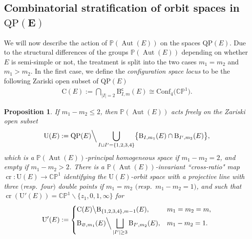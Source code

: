 \documentclass[10pt,a4paper]{amsart}
\newcommand{\field}[1]{\ensuremath{\mathbb{#1}}}
\newcommand{\CC}{\field{C}}
\newcommand{\PP}{\field{P}}
\DeclareMathOperator{\Aut}{Aut}
\numberwithin{equation}{section}
\newtheorem{Proposition}[Theorem]{Proposition}
 { \theoremstyle{definition}
\newtheorem{Definition}[Theorem]{Definition}
\newtheorem{Note}[Theorem]{Note}
\newtheorem{Example}[Theorem]{Example}
\newtheorem{Remark}[Theorem]{Remark} }
\begin{document}
\subsection[Combinatorial stratification of orbit spaces in QP(E)]
{Combinatorial stratification of orbit spaces in $\boldsymbol{\mathrm{QP}(E)}$}%
We will now describe the action of $\PP(\Aut(E))$ on the spaces $\mathrm{QP}(E)$. Due to the structural differences of the groups $\PP(\Aut(E))$ depending on whether $E$ is semi-simple or not, the treatment is split into the two cases $m_{1} = m_{2}$ and $m_{1} > m_{2}$. In the first case, we define the \emph{configuration space locus} to be the following Zariski open subset of $\mathrm{QP}(E)$
\begin{gather*}%
\mathrm{C}(E):=\bigcap_{\vert I\vert =2} \mathrm{B}^{\mathsf{c}}_{I,m}(E)\cong \mathrm{Conf}_{4}\big(\CC\PP^{1}\big).
\end{gather*}


\begin{Proposition}\label{prop:U}
If $m_{1}-m_{2} \leq 2$, then $\PP(\Aut(E))$ acts freely on the Zariski open subset
\[
\mathrm{U}(E) :=
\displaystyle\mathrm{QP}(E)\Big\backslash \bigcup_{I\sqcup I' = \{1,2,3,4\}} \bigl\{\mathrm{B}_{I,m_{1}}(E)\cap\mathrm{B}_{I',m_{2}}(E)\bigr\},
\]
which is a $\PP(\Aut(E))$-principal homogeneous space if $m_{1}-m_{2}=2$, and empty if $m_{1}-m_{2}>2$. There is a $\PP(\Aut(E))$-invariant ``cross-ratio" map $\operatorname{cr}\colon \mathrm{U}(E)\rightarrow \CC\PP^{1}$ identifying the $\mathrm{U}(E)$-orbit space with a projective line with three $($resp.~four$)$ double points if $m_{1} = m_{2}$ $($resp.~$m_{1} - m_{2} = 1)$, and such that $\operatorname{cr}(\mathrm{U}'(E)) = \CC\PP^{1}\backslash\{z_{1},0,1,\infty\}$ for
\[
\mathrm{U}'(E):= \begin{cases}
\mathrm{C}(E)\big\backslash\mathrm{B}_{\{1,2,3,4\},m-1}(E), & m_{1}=m_{2}=m,
\\[1ex]
\displaystyle\mathrm{B}_{\varnothing ,m_{1}}(E)\Big\backslash\bigsqcup_{\vert I'\vert \geq 3} \mathrm{B}_{I',m_{2}}(E), & m_{1}-m_{2}=1.
\end{cases}
\]
\end{Proposition}
\end{document}
